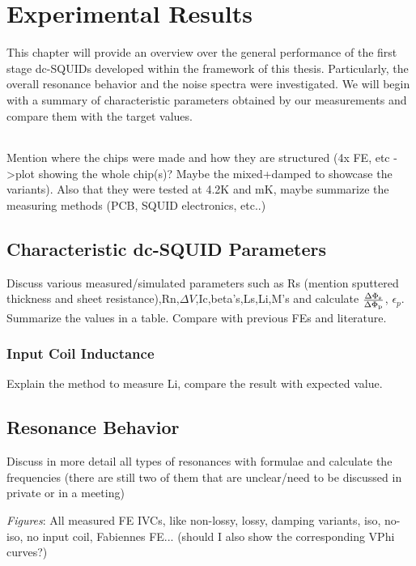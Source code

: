 \chapter{Experimental Results} \label{ch_results}

This chapter will provide an overview over the general performance of the first stage dc-SQUIDs developed within the framework of this thesis. Particularly, the overall resonance behavior and the noise spectra were investigated. We will begin with a summary of characteristic parameters obtained by our measurements and compare them with the target values.  

\begin{tabular}{l*{6}{c}}


\end{tabular}

Mention where the chips were made and how they are structured (4x FE, etc ->plot showing the whole chip(s)? Maybe the mixed+damped to showcase the variants). Also that they were tested at 4.2K and mK, maybe summarize the measuring methods (PCB, SQUID electronics, etc..)

\section{Characteristic dc-SQUID Parameters}

Discuss various measured/simulated parameters such as Rs (mention sputtered thickness and sheet resistance),Rn,$\Delta V$,Ic,beta's,Ls,Li,M's and calculate $\frac{\Delta\Phi_{\rm s}}{\Delta\Phi_{\rm p}}$, $\epsilon_p$. Summarize the values in a table. Compare with previous FEs and literature. 

\subsection{Input Coil Inductance}

Explain the method to measure Li, compare the result with expected value.

\section{Resonance Behavior}\label{sec_resonance_results}

Discuss in more detail all types of resonances with formulae and calculate the frequencies (there are still two of them that are unclear/need to be discussed in private or in a meeting)

\textit{Figures}: All measured FE IVCs, like non-lossy, lossy, damping variants, iso, no-iso, no input coil, Fabiennes FE... (should I also show the corresponding VPhi curves?)

